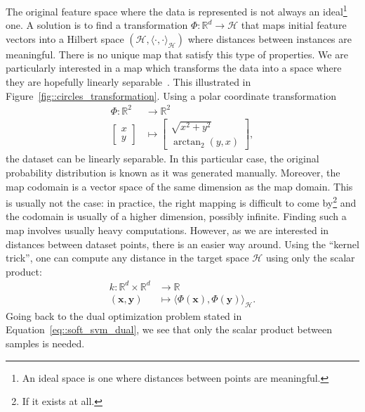         The original feature space where the data is represented is not always an ideal\footnote{An ideal space is one where distances between points are meaningful.} one.
        A solution is to find a transformation $\Phi: \mathbb{R}^d \rightarrow \mathscr{H}$ that maps initial feature vectors into a Hilbert space $(\mathscr{H}, \langle\cdot{,}\cdot\rangle_{\mathscr{H}})$ where distances between instances are meaningful.
        There is no unique map that satisfy this type of properties.
        We are particularly interested in a map which transforms the data into a space where they are hopefully linearly separable~\parencite{boser1992training}.
        This illustrated in Figure~\ref{fig::circles_transformation}.
        Using a polar coordinate transformation 
        \begin{align*}
            \Phi: \mathbb{R}^2 &\rightarrow \mathbb{R}^2 \\
            \begin{bmatrix}
                x \\
                y
            \end{bmatrix} &\mapsto \begin{bmatrix}
                \sqrt{x^2 + y^2} \\
                \operatorname{arctan}_2(y, x)
            \end{bmatrix},
        \end{align*}
        the dataset can be linearly separable.
        In this particular case, the original probability distribution is known as it was generated manually.
        Moreover, the map codomain is a vector space of the same dimension as the map domain.
        This is usually not the case: in practice, the right mapping is difficult to come by\footnote{If it exists at all.} and the codomain is usually of a higher dimension, possibly infinite.
        Finding such a map involves usually heavy computations.
        However, as we are interested in distances between dataset points, there is an easier way around.
        Using the ``kernel trick'', one can compute any distance in the target space $\mathscr{H}$ using only the scalar product:
        \begin{align}
            \label{eq::kernel_definition}
            k: \mathbb{R}^d \times \mathbb{R}^d &\rightarrow \mathbb{R}\\
            (\bm{x}, \bm{y}) &\mapsto \langle\Phi(\bm{x}), \Phi(\bm{y})\rangle_{\mathscr{H}} \nonumber.
        \end{align}
        Going back to the dual optimization problem stated in Equation~\ref{eq::soft_svm_dual}, we see that only the scalar product between samples is needed.
